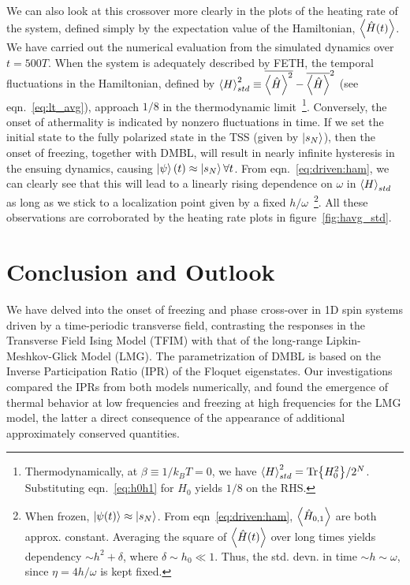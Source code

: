 \documentclass[%
reprint,
superscriptaddress,
amsmath,amssymb,
aps,
prb,
showkeys,
]{revtex4-2}
\begin{document}
We can also look at this crossover more clearly in the plots of the heating rate of the system, defined simply by the expectation value of the Hamiltonian, $\expval{\hat{H}(t)}$. We have carried out the numerical evaluation from the simulated dynamics over $t=500 T$. When the system is adequately described by FETH, the temporal fluctuations in the {Hamiltonian}, defined by $\expval{H}^2_{std}\equiv \overline{\expval{\hat{H}}^2}-\overline{\expval{\hat{H}}}^2$ (see eqn.~\ref{eq:lt_avg}), approach $1/8$ in the thermodynamic limit~\footnote{Thermodynamically, at $\beta\equiv 1/k_BT=0$, we have $\expval{H}^2_{std}=\Tr{H^2_0}/2^N$. Substituting eqn.~\ref{eq:h0h1} for $H_0$ yields $1/8$ on the RHS.}. Conversely, the onset of athermality is indicated by nonzero fluctuations in time. If we set the initial state to the fully polarized state in the TSS (given by $\ket{s_N}$), then the 
onset of freezing, together with DMBL, will result in nearly infinite hysteresis in the ensuing dynamics, causing $\ket{\psi}(t)\approx \ket{s_N} \forall t$. From eqn.~\ref{eq:driven:ham}, we can clearly see that this will lead to a linearly rising dependence on $\omega$ in $\expval{H}_{std}$ as long as we stick to a {localization point given by a fixed} $h/\omega$~\footnote{When frozen, $\ket{\psi(t)}\approx \ket{s_N}$. From eqn~\ref{eq:driven:ham}, $\expval{\hat{H}_{0,1}}$ are both approx. constant. Averaging the square of $\expval{\hat{H}(t)}$ over long times yields dependency  $\sim h^2 + \delta$, where $\delta\sim h_0\ll 1$. Thus, the std. devn. in time $\sim h\sim \omega$, since $\eta=4h/\omega$ is kept fixed.}. All these observations are corroborated by the heating rate plots in figure~\ref{fig:havg_std}.	
\section{\label{sec:level7}Conclusion and Outlook}
We have delved into the onset of freezing and phase cross-over in 1D spin systems driven by a time-periodic transverse field, contrasting the responses in the Transverse Field Ising Model (TFIM) with that of the long-range Lipkin-Meshkov-Glick Model (LMG). The parametrization of DMBL is based on the Inverse Participation Ratio (IPR) of the Floquet eigenstates. Our investigations compared the IPRs from both models numerically, and found the emergence of thermal behavior at low frequencies and freezing at high frequencies for the LMG model, the latter a direct consequence of the appearance of additional approximately conserved quantities.
\end{document}
